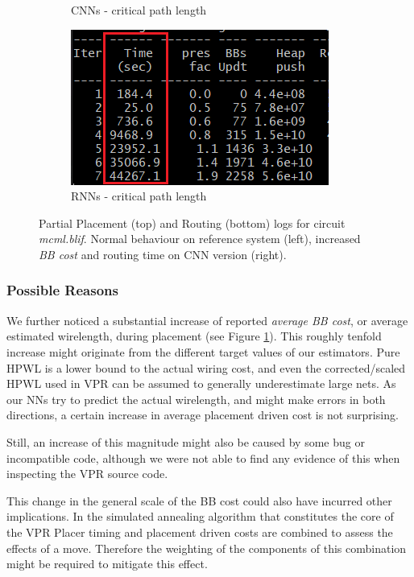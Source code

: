 \begin{figure}
\begin{subfigure}[b]{0.49\linewidth}
		\caption{\glspl{CNN} - critical path length}
	\end{subfigure}
	\begin{subfigure}[b]{0.49\linewidth}
		\includegraphics[width=\linewidth]{plots/log_route_cnn.png}
		\caption{\glspl{RNN} - critical path length}
	\end{subfigure}
	\caption{Partial Placement (top) and Routing (bottom) logs for circuit \textit{mcml.blif}. Normal behaviour on reference system (left), increased \textit{\gls{BB} cost} and routing time on \gls{CNN} version (right).}
	\label{fig:eval-problem-logs}
\end{figure}

\subsubsection{Possible Reasons}

We further noticed a substantial increase of reported \textit{average \gls{BB} cost}, or average estimated wirelength, during placement (see Figure \ref{fig:eval-problem-logs}). This roughly tenfold increase might originate from the different target values of our estimators. Pure \gls{HPWL} is a lower bound to the actual wiring cost, and even the corrected/scaled \gls{HPWL} used in \gls{VPR} can be assumed to generally underestimate large nets. As our \glspl{NN} try to predict the actual wirelength, and might make errors in both directions, a certain increase in average placement driven cost is not surprising.

Still, an increase of this magnitude might also be caused by some bug or incompatible code, although we were not able to find any evidence of this when inspecting the \gls{VPR} source code.

This change in the general scale of the \gls{BB} cost could also have incurred other implications. In the simulated annealing algorithm that constitutes the core of the \gls{VPR} Placer timing and placement driven costs are combined to assess the effects of a move. Therefore the weighting of the components of this combination might be required to mitigate this effect.

